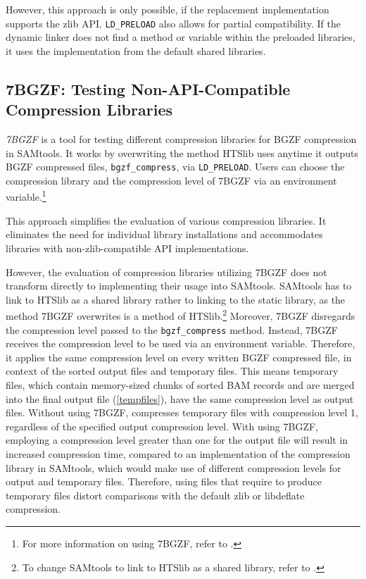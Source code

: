 However, this approach is only possible, if the replacement implementation supports the zlib API.  \texttt{LD\_PRELOAD} also allows for partial compatibility. If the dynamic linker does not find a method or variable within the preloaded libraries,  it uses the implementation from the default shared libraries.

\subsection{7BGZF: Testing Non-API-Compatible Compression Libraries}
\textit{7BGZF} \cite{yamada_7bgzf_2020} is a tool for testing different compression libraries for BGZF compression in SAMtools. It works by overwriting the method HTSlib uses anytime it outputs BGZF compressed files, \texttt{bgzf\_compress}, via \texttt{LD\_PRELOAD}. 
Users can choose the compression library and the compression level of 7BGZF via an environment variable.\footnote{For more information on using 7BGZF, refer to .}

This approach simplifies the evaluation of various compression libraries. It eliminates the need for individual library installations and accommodates libraries with non-zlib-compatible API implementations.

However, the evaluation of compression libraries utilizing 7BGZF does not transform directly to implementing their usage into SAMtools. SAMtools has to link to HTSlib as a shared library rather to linking to the static library, as the method 7BGZF overwrites is a method of HTSlib.\footnote{To change SAMtools to link to HTSlib as a shared library, refer to .}
Moreover, 7BGZF disregards the compression level passed to the \texttt{bgzf\_compress} method. Instead, 7BGZF receives the compression level to be used via an environment variable. Therefore, it applies the same compression level on every written BGZF compressed file, in context of \sort the sorted output files and temporary files. 
This means temporary files, which contain memory-sized chunks of sorted BAM records and are merged into the final output file (\ref{tempfiles}), have the same compression level as output files. Without using 7BGZF, \sort compresses temporary files with compression level 1, regardless of the specified output compression level. With using 7BGZF, employing a compression level greater than one for the output file will result in increased compression time, compared to an implementation of the compression library in SAMtools, which would make use of different compression levels for output and temporary files. Therefore, using files that require \sort to produce temporary files distort comparisons with the default zlib or libdeflate compression.

